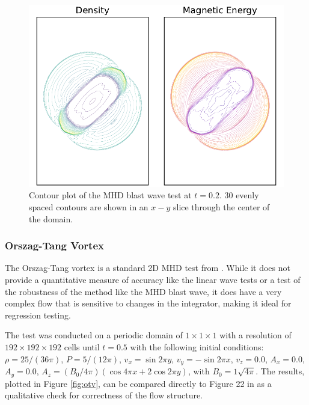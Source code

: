 \begin{figure}[ht!]
    \includegraphics[width=\linewidth]{assets/3-mhd-tests/mhd-blast.pdf}
    \caption{Contour plot of the MHD blast wave test at $t=0.2$. 30 evenly spaced contours are shown in an $x-y$ slice through the center of the domain. }
    \label{fig:blast}
\end{figure}

\subsubsection{Orszag-Tang Vortex}
\label{sec:otv}

The Orszag-Tang vortex is a standard 2D MHD test from \cite{otv_1979}. While it does not provide a quantitative measure of accuracy like the linear wave tests or a test of the robustness of the method like the MHD blast wave, it does have a very complex flow that is sensitive to changes in the integrator, making it ideal for regression testing.

The test was conducted on a periodic domain of $1\times1\times1$ with a resolution of $192\times192\times192$ cells until $t = 0.5$ with the following initial conditions: 
$\rho = 25 / \left( 36 \pi \right)$,
$P    =  5 / \left( 12 \pi \right)$,
$v_x  = \sin 2\pi y$,
$v_y  = -\sin 2\pi x$,
$v_z  = 0.0$,
$A_x  = 0.0$,
$A_y  = 0.0$,
$A_z  = \left( B_0/4\pi \right) \left( \cos{4\pi x} + 2 \cos{2\pi y} \right)$, with $B_0 = 1\sqrt{4\pi}$.
The results, plotted in Figure \ref{fig:otv}, can be compared directly to Figure 22 in \cite{stone_athena_2008} as a qualitative check for correctness of the flow structure.

